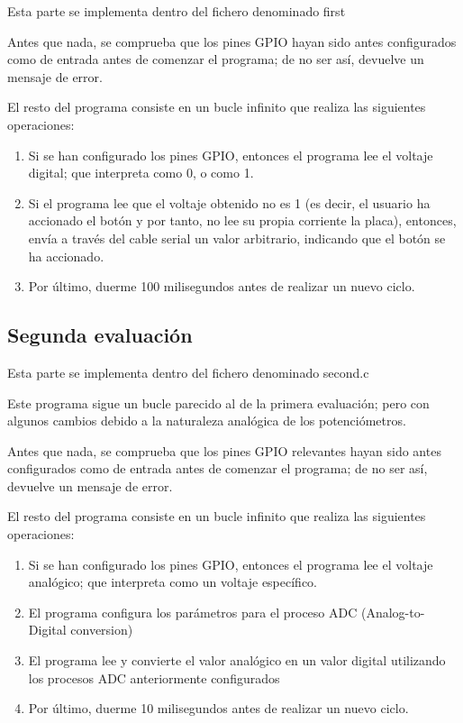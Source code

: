 \documentclass[12pt,a4paper,twoside,openright]{book}
\begin{document}
Esta parte se implementa dentro del fichero denominado first

Antes que nada, se comprueba que los pines GPIO hayan sido antes configurados como de entrada antes de comenzar el programa; de no ser así, devuelve un mensaje de error.

El resto del programa consiste en un bucle infinito que realiza las siguientes operaciones:

\begin{enumerate}
  \item Si se han configurado los pines GPIO, entonces el programa lee el voltaje digital; que interpreta como 0, o como 1.
  \item Si el programa lee que el voltaje obtenido no es 1 (es decir, el usuario ha accionado el botón y por tanto, no lee su propia corriente la placa), entonces, envía a través del cable serial un valor arbitrario, indicando que el botón se ha accionado.
  \item Por último, duerme 100 milisegundos antes de realizar un nuevo ciclo.
\end{enumerate}

\subsection{Segunda evaluación}

Esta parte se implementa dentro del fichero denominado second.c

Este programa sigue un bucle parecido al de la primera evaluación; pero con algunos cambios debido a la naturaleza analógica de los potenciómetros.

Antes que nada, se comprueba que los pines GPIO relevantes hayan sido antes configurados como de entrada antes de comenzar el programa; de no ser así, devuelve un mensaje de error.

El resto del programa consiste en un bucle infinito que realiza las siguientes operaciones:

\begin{enumerate}
  \item Si se han configurado los pines GPIO, entonces el programa lee el voltaje analógico; que interpreta como un voltaje específico.
  \item El programa configura los parámetros para el proceso ADC (Analog-to-Digital conversion)
  \item El programa lee y convierte el valor analógico en un valor digital utilizando los procesos ADC anteriormente configurados
  \item Por último, duerme 10 milisegundos antes de realizar un nuevo ciclo.
\end{enumerate}
\end{document}
